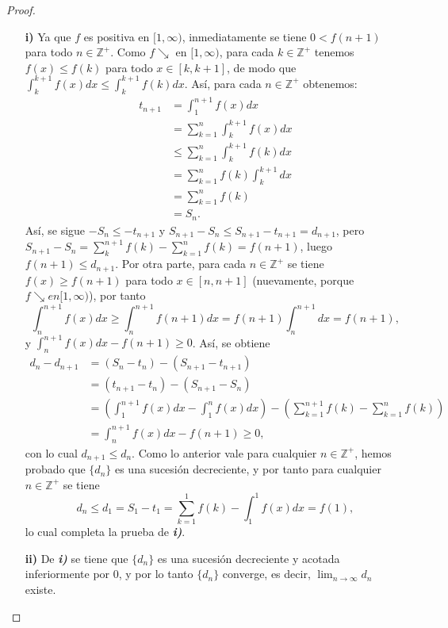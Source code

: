 \begin{proof}
  \begin{itemize}
    \item[\textbf{i)}] Ya que $f$ es positiva en $[1,\infty)$, inmediatamente se tiene $0<f(n+1)$ para todo $n\in\mathbb{Z}^+$. Como $f \searrow$ en $[1,\infty)$, para cada $k\in\mathbb{Z}^+$ tenemos $f(x)\leq f(k)$ para todo $x\in[k,k+1]$, de modo que $\int_k^{k+1}f(x)dx\leq \int_k^{k+1}f(k)dx$. Así, para cada $n\in\mathbb{Z}^+$ obtenemos:
    \begin{align*}
      t_{n+1}&=\int_1^{n+1}f(x)dx\\
      &=\sum_{k=1}^n \int_k^{k+1}f(x)dx\\
      &\leq\sum_{k=1}^n \int_k^{k+1}f(k)dx\\
      &=\sum_{k=1}^n f(k)\int_k^{k+1}dx\\
      &=\sum_{k=1}^n f(k)\\
      &=S_n.
    \end{align*}
    Así, se sigue $-S_n\leq-t_{n+1}$ y $S_{n+1}-S_n\leq S_{n+1}-t_{n+1}=d_{n+1}$, pero $S_{n+1}-S_n=\sum_k^{n+1}f(k)-\sum_{k=1}^nf(k)=f(n+1)$, luego $f(n+1)\leq d_{n+1}$. Por otra parte, para cada $n\in\mathbb{Z}^+$ se tiene $f(x)\geq f(n+1)$ para todo $x\in[n,n+1]$ (nuevamente, porque $f\searrow en [1,\infty)$), por tanto
    \begin{equation*}
      \int_n^{n+1}f(x)dx\geq\int_n^{n+1}f(n+1)dx=f(n+1)\int_n^{n+1}dx=f(n+1),
    \end{equation*}
    y $\int_n^{n+1}f(x)dx-f(n+1)\geq 0$. Así, se obtiene
    \begin{align*}
      d_n-d_{n+1}&=(S_n-t_n)-(S_{n+1}-t_{n+1})\\
      &=(t_{n+1}-t_n)-(S_{n+1}-S_n)\\
      &=\left(\int_1^{n+1}f(x)dx-\int_1^{n}f(x)dx\right)-\left(\sum_{k=1}^{n+1}f(k)-\sum_{k=1}^n f(k)\right)\\
      &=\int_n^{n+1}f(x)dx-f(n+1)\geq 0,
    \end{align*}
    con lo cual $d_{n+1}\leq d_n$. Como lo anterior vale para cualquier $n\in\mathbb{Z}^+$, hemos probado que $\lbrace{d_n\rbrace}$ es una sucesión decreciente, y por tanto para cualquier $n\in\mathbb{Z}^+$ se tiene
    \begin{equation*}
      d_n\leq d_1=S_1-t_1=\sum_{k=1}^1f(k)-\int_1^{1}f(x)dx=f(1),
    \end{equation*}
    lo cual completa la prueba de \textit{\textbf{i)}}.
    \item[\textbf{ii)}] De \textit{\textbf{i)}} se tiene que $\lbrace{d_n\rbrace}$ es una sucesión decreciente y acotada inferiormente por $0$, y por lo tanto $\lbrace{d_n\rbrace}$ converge, es decir, $\lim_{n\to\infty}d_n$ existe.

\end{itemize}
\end{proof}
